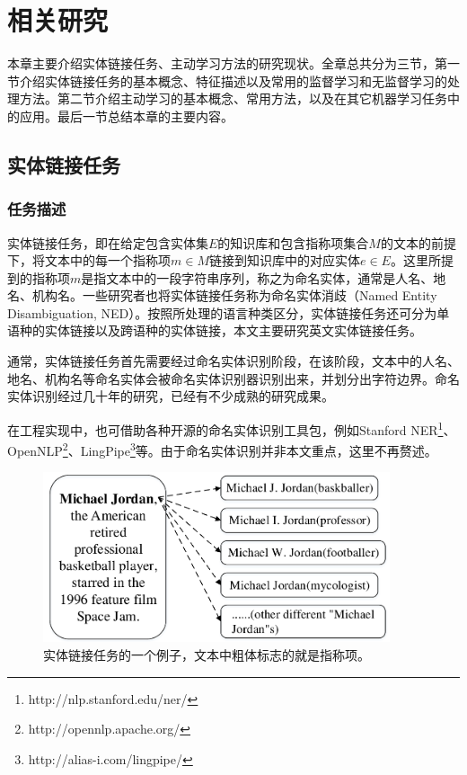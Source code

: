 \chapter{相关研究}
本章主要介绍实体链接任务、主动学习方法的研究现状。全章总共分为三节，第一节介绍实体链接任务的基本概念、特征描述以及常用的监督学习和无监督学习的处理方法。第二节介绍主动学习的基本概念、常用方法，以及在其它机器学习任务中的应用。最后一节总结本章的主要内容。

\section{实体链接任务}
\subsection{任务描述}
实体链接任务，即在给定包含实体集$E$的知识库和包含指称项集合$M$的文本的前提下，将文本中的每一个指称项$m\in M$链接到知识库中的对应实体$e\in E$。这里所提到的指称项$m$是指文本中的一段字符串序列，称之为命名实体，通常是人名、地名、机构名。一些研究者也将实体链接任务称为命名实体消歧（Named Entity Disambiguation, NED）。按照所处理的语言种类区分，实体链接任务还可分为单语种的实体链接以及跨语种的实体链接\cite{CLELBBTM}，本文主要研究英文实体链接任务。

通常，实体链接任务首先需要经过命名实体识别阶段，在该阶段，文本中的人名、地名、机构名等命名实体会被命名实体识别器识别出来，并划分出字符边界。命名实体识别经过几十年的研究，已经有不少成熟的研究成果\cite{RWNERST,NEROEHRTCDA,RHENERCCBEL}。

在工程实现中，也可借助各种开源的命名实体识别工具包，例如Stanford NER\footnote{http://nlp.stanford.edu/ner/}、OpenNLP\footnote{http://opennlp.apache.org/}、LingPipe\footnote{http://alias-i.com/lingpipe/}等。由于命名实体识别并非本文重点，这里不再赘述。

\begin{figure}[!htb]
	\centering\includegraphics[height=5cm]{resource/el_example}
	\caption{实体链接任务的一个例子，文本中粗体标志的就是指称项。}
	\label{fig:el_example}
\end{figure}

